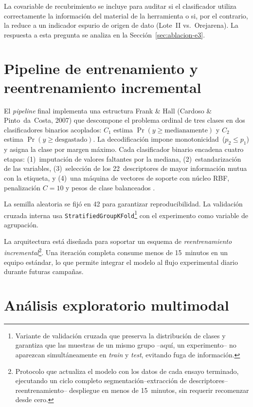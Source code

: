 \documentclass[12pt, letterpaper]{report}
\begin{document}
La covariable de recubrimiento se incluye para auditar si el clasificador
utiliza correctamente la información del material de la herramienta o si,
por el contrario, la reduce a un indicador espurio de origen de dato
(Lote~II vs.~Orejarena). La respuesta a esta pregunta se analiza en la
Sección~\ref{sec:ablacion-e3}.

\section{Pipeline de entrenamiento y reentrenamiento incremental}
\label{sec:pipeline-train}

El \textit{pipeline} final implementa una estructura Frank \& Hall
(Cardoso \& Pinto~da~Costa, 2007) que descompone el problema ordinal de
tres clases en dos clasificadores binarios acoplados:
$C_1$ estima $\Pr(y \geq \text{medianamente})$ y $C_2$ estima
$\Pr(y \geq \text{desgastado})$. La decodificación impone
monotonicidad~($p_2 \leq p_1$) y asigna la clase por margen máximo. Cada clasificador binario encadena cuatro etapas: (1)~imputación de valores faltantes por la mediana, (2)~estandarización de las variables, (3)~selección de los 22~descriptores de mayor información mutua con la etiqueta, y (4)~una máquina de vectores de soporte con núcleo RBF, penalización $C=10$ y pesos de clase balanceados \cite{geron2023}.

La semilla aleatoria se fijó en 42 para garantizar reproducibilidad. La
validación cruzada interna usa
\texttt{StratifiedGroupKFold}\footnote{Variante de validación cruzada
que preserva la distribución de clases y garantiza que las muestras de
un mismo grupo --aquí, un experimento-- no aparezcan simultáneamente en
\emph{train} y \emph{test}, evitando fuga de información.} con el
experimento como variable de agrupación.

La arquitectura está diseñada para soportar un esquema de
\emph{reentrenamiento incremental}\footnote{Protocolo que actualiza el
modelo con los datos de cada ensayo terminado, ejecutando un ciclo
completo segmentación--extracción de descriptores--reentrenamiento--
despliegue en menos de 15~minutos, sin requerir recomenzar desde cero.}.
Una iteración completa consume menos de 15~minutos en un equipo
estándar, lo que permite integrar el modelo al flujo experimental
diario durante futuras campañas.

\section{Análisis exploratorio multimodal}
\label{sec:exploratorio}
\end{document}
